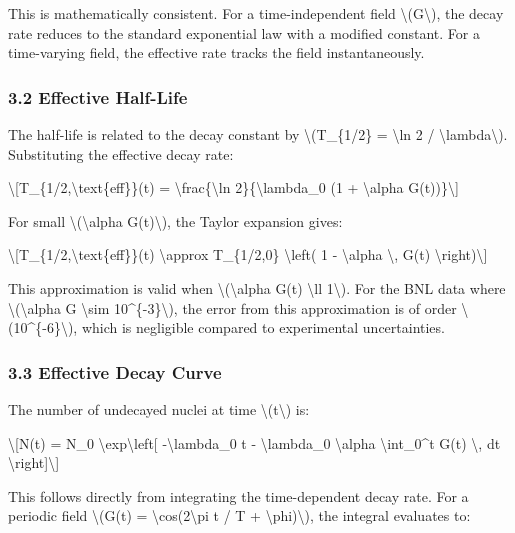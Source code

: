 \documentclass[
  10pt,
]{article}
\begin{document}
This is mathematically consistent. For a time-independent field
\textbackslash(G\textbackslash), the decay rate reduces to the standard
exponential law with a modified constant. For a time-varying field, the
effective rate tracks the field instantaneously.

\hypertarget{effective-half-life}{%
\subsubsection{3.2 Effective Half-Life}\label{effective-half-life}}

The half-life is related to the decay constant by
\textbackslash(T\_\{1/2\} = \textbackslash ln 2 /
\textbackslash lambda\textbackslash). Substituting the effective decay
rate:

\textbackslash{[}T\_\{1/2,\textbackslash text\{eff\}\}(t) =
\textbackslash frac\{\textbackslash ln 2\}\{\textbackslash lambda\_0 (1
+ \textbackslash alpha G(t))\}\textbackslash{]}

For small \textbackslash(\textbackslash alpha G(t)\textbackslash), the
Taylor expansion gives:

\textbackslash{[}T\_\{1/2,\textbackslash text\{eff\}\}(t)
\textbackslash approx T\_\{1/2,0\} \textbackslash left( 1 -
\textbackslash alpha \textbackslash, G(t)
\textbackslash right)\textbackslash{]}

This approximation is valid when
\textbackslash(\textbar\textbackslash alpha G(t)\textbar{}
\textbackslash ll 1\textbackslash). For the BNL data where
\textbackslash(\textbackslash alpha G \textbackslash sim
10\^{}\{-3\}\textbackslash), the error from this approximation is of
order \textbackslash(10\^{}\{-6\}\textbackslash), which is negligible
compared to experimental uncertainties.

\hypertarget{effective-decay-curve}{%
\subsubsection{3.3 Effective Decay Curve}\label{effective-decay-curve}}

The number of undecayed nuclei at time \textbackslash(t\textbackslash)
is:

\textbackslash{[}N(t) = N\_0 \textbackslash exp\textbackslash left{[}
-\textbackslash lambda\_0 t - \textbackslash lambda\_0
\textbackslash alpha \textbackslash int\_0\^{}t G(t\textquotesingle)
\textbackslash, dt\textquotesingle{}
\textbackslash right{]}\textbackslash{]}

This follows directly from integrating the time-dependent decay rate.
For a periodic field \textbackslash(G(t) =
\textbackslash cos(2\textbackslash pi t / T +
\textbackslash phi)\textbackslash), the integral evaluates to:
\end{document}
